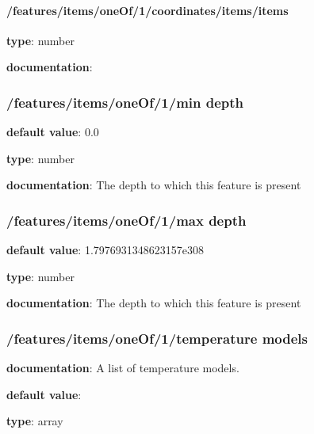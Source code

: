 \begin{itemized}
\begin{itemized}
\paragraph{/features/items/oneOf/1/coordinates/items/items} \begin{itemized}
\item {\bf type}: number
\end{itemized}\item {\bf documentation}: 
\end{itemized}\end{itemized}\subsubsection{/features/items/oneOf/1/min depth} \begin{itemized}
\item {\bf default value}: 0.0
\item {\bf type}: number
\item {\bf documentation}: The depth to which this feature is present
\end{itemized}\subsubsection{/features/items/oneOf/1/max depth} \begin{itemized}
\item {\bf default value}: 1.7976931348623157e308
\item {\bf type}: number
\item {\bf documentation}: The depth to which this feature is present
\end{itemized}\subsubsection{/features/items/oneOf/1/temperature models} \begin{itemized}
\item {\bf documentation}: A list of temperature models.
\item {\bf default value}: 
\item {\bf type}: array

\end{itemized}
